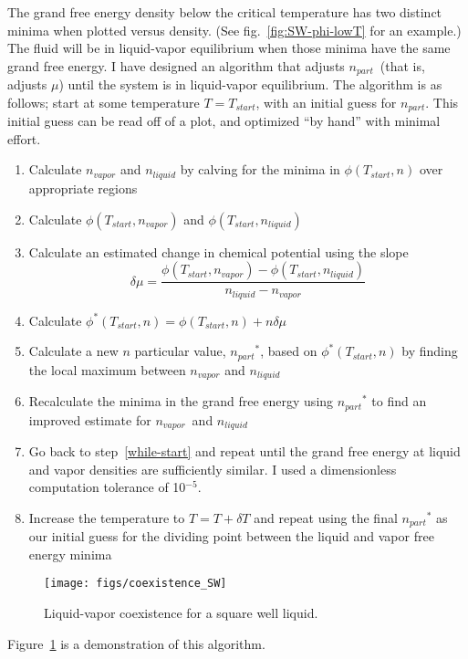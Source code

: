 \documentclass[letterpaper,twocolumn,amsmath,amssymb,prb]{revtex4-1}
\newcommand{\npart}{\ensuremath{n_\textit{part}}}
\newcommand{\nliq}{\ensuremath{n_\textit{liquid}}}
\newcommand{\nvap}{\ensuremath{n_\textit{vapor}}}
\begin{document}
The grand free energy density below the critical temperature has two distinct minima when
plotted versus density. (See fig.~\ref{fig:SW-phi-lowT} for an
example.) The fluid will be in liquid-vapor equilibrium when those
minima have the same grand free energy. I have designed an algorithm
that adjusts \npart\ (that is, adjusts $\mu$) until the system is in
liquid-vapor equilibrium.  The algorithm is as follows; start at some
temperature $T=T_{start}$, with an initial guess for $\npart$. This
initial guess can be read off of a plot, and optimized ``by hand''
with minimal effort.
\begin{enumerate}
  \item Calculate $\nvap$ and $\nliq$ by calving for the minima in $\phi(T_{start},n)$ over appropriate regions
  \item Calculate $\phi(T_{start},\nvap)$ and $\phi(T_{start},\nliq)$ \label{while-start}
  \item Calculate an estimated change in chemical potential using the slope \[\delta\mu = \frac{\phi(T_{start},\nvap) - \phi(T_{start},\nliq)}{\nliq - \nvap}\]
  \item Calculate $\phi^*(T_{start},n) = \phi(T_{start},n) + n\delta\mu$
  \item Calculate a new $n$ particular value, $\npart^*$, based on $\phi^*(T_{start},n)$ by finding the local maximum between $\nvap$ and $\nliq$
  \item Recalculate the minima in the grand free energy using $\npart^*$ to find an improved estimate for \nvap\ and \nliq
  \item Go back to step~\ref{while-start} and repeat until the grand free energy at liquid and vapor densities are sufficiently similar. I used a dimensionless computation tolerance of 10$^{-5}$.
  \item Increase the temperature to $T = T + \delta T$ and repeat using the final $\npart^*$ as our initial guess for the dividing point between the liquid and vapor free energy minima
\end{enumerate}

\begin{figure}
  \begin{center}
  \texttt{[image: figs/coexistence\_SW]}
  \end{center}
  \caption{Liquid-vapor coexistence for a square well liquid.}
  \label{fig:coexistance_SW}
\end{figure}

Figure~\ref{fig:coexistance_SW} is a demonstration of this algorithm.
\end{document}
